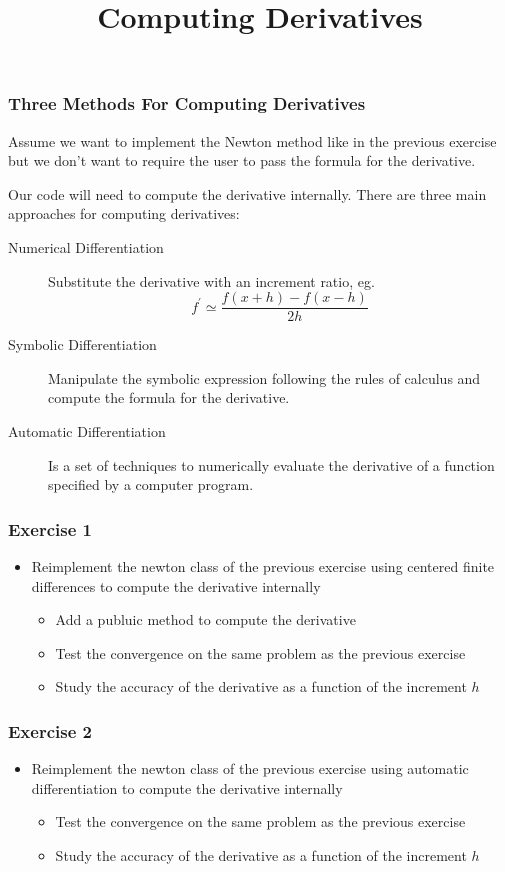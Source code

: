 \documentclass[smaller,a4paper,allowframebreaks]{beamer}
\begin{document}
\title{Computing Derivatives}
\frame{\titlepage}

\begin{frame}
\frametitle{Three Methods For Computing Derivatives}
Assume we want to implement the Newton method like in the previous exercise
but we don't want to require the user to pass the formula for the derivative.

Our code will need to compute the derivative internally. 
There are three main approaches for computing derivatives:

\begin{description}
\item [Numerical Differentiation] Substitute the derivative with an increment ratio, eg.
$$
f^{\prime} \simeq \dfrac{f(x+h) - f(x-h)}{2h}
$$
\item [Symbolic Differentiation] Manipulate the symbolic expression following the rules of calculus and compute the formula for the derivative.
\item [Automatic Differentiation] Is a set of techniques to numerically evaluate the derivative of a function specified by a computer program.
\end{description}
\end{frame}


\begin{frame}
\frametitle{Exercise 1}

\begin{itemize}
\item Reimplement the newton class of the previous exercise using centered finite differences to compute the derivative internally
      \begin{itemize}
            \item Add a publuic method to compute the derivative
      \item Test the convergence on the same problem as the previous exercise
      \item Study the accuracy of the derivative as a function of the increment $h$
      \end{itemize}      
\end{itemize}
\end{frame}

\begin{frame}
\frametitle{Exercise 2}

\begin{itemize}
\item Reimplement the newton class of the previous exercise using automatic differentiation to compute the derivative internally
      \begin{itemize}
      \item Test the convergence on the same problem as the previous exercise
      \item Study the accuracy of the derivative as a function of the increment $h$
      \end{itemize}      
\end{itemize}
\end{frame}
\end{document}

